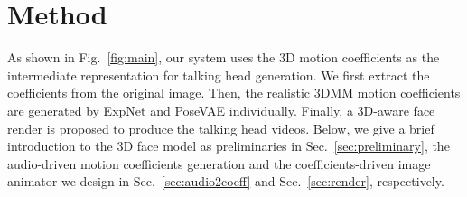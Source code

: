 \section{Method}
\label{sec:method}

As shown in Fig.~\ref{fig:main}, our system uses the 3D motion coefficients as the intermediate representation for talking head generation. We first extract the coefficients from the original image. Then, the realistic 3DMM motion coefficients are generated by ExpNet and PoseVAE individually. Finally, a 3D-aware face render is proposed to produce the talking head videos. Below, we give a brief introduction to the 3D face model as preliminaries in Sec.~\ref{sec:preliminary}, the audio-driven motion coefficients generation and the coefficients-driven image animator we design in Sec.~\ref{sec:audio2coeff} and Sec.~\ref{sec:render}, respectively.  




